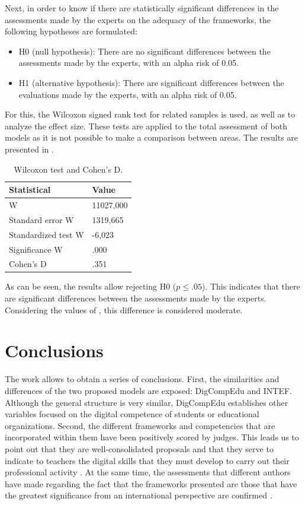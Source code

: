 \documentclass{textolivre}
\begin{document}
Next, in order to know if there are statistically significant differences in
the assessments made by the experts on the adequacy of the frameworks, the
following hypotheses are formulated:
\begin{itemize}
\item H0 (null hypothesis): There are no significant differences between the
assessments made by the experts, with an alpha risk of 0.05.
\item H1 (alternative hypothesis): There are significant differences between
the evaluations made by the experts, with an alpha risk of 0.05.
\end{itemize}

For this, the Wilcoxon signed rank test for related samples \cite{siegel1976} is
used, as well as \textcite{cohen2013statistical} to analyze the effect size. These tests are
applied to the total assessment of both models as it is not possible to make a
comparison between areas. The results are presented in .

\begin{table}[htpb]
\caption{Wilcoxon test and Cohen's D.}
\label{tab04}
\centering
\begin{tabular}{ll}
\toprule 
Statistical & Value \\
\midrule
W & 11027,000 \\
Standard error W & 1319,665 \\
Standardized test W & -6,023 \\
Significance W & .000 \\
Cohen's D & .351 \\
\bottomrule
\end{tabular}
\end{table}

As can be seen, the results allow rejecting H0 ($p \leq .05$). This indicates
that there are significant differences between the assessments made by the
experts. Considering the values of \textcite{cohen2013statistical}, this difference is considered
moderate.


\section{Conclusions}\label{sec-concl}
The work allows to obtain a series of conclusions. First, the similarities and
differences of the two proposed models are exposed: DigCompEdu and INTEF.
Although the general structure is very similar, DigCompEdu establishes other
variables focused on the digital competence of students or educational
organizations. Second, the different frameworks and competencies that are
incorporated within them have been positively scored by judges. This leads us
to point out that they are well-consolidated proposals and that they serve to
indicate to teachers the digital skills that they must develop to carry out
their professional activity \cite{falloon2020}. At the same time, the assessments
that different authors have made regarding the fact that the frameworks
presented are those that have the greatest significance from an international
perspective are confirmed \cite{prendesEspinosa2011,duranCuartero2019,caberoAlmenara2019,lazaroCantabrana2019,rodrguezGarca2019,silva2019,caberoAlmenara2019,ruizCabezas2020}.
\end{document}
